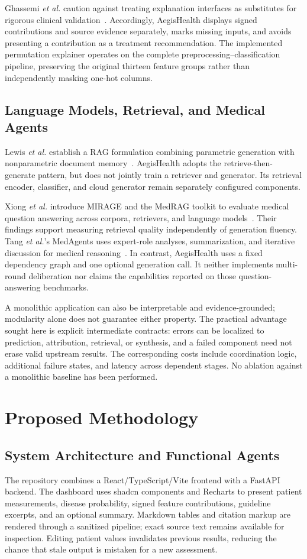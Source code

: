 \documentclass[journal]{IEEEtran}
\newcommand{\system}{AegisHealth}
\begin{document}
Ghassemi \emph{et al.} caution against treating explanation interfaces as substitutes for rigorous clinical validation~\cite{ghassemi2021}. Accordingly, \system{} displays signed contributions and source evidence separately, marks missing inputs, and avoids presenting a contribution as a treatment recommendation. The implemented permutation explainer operates on the complete preprocessing--classification pipeline, preserving the original thirteen feature groups rather than independently masking one-hot columns.

\subsection{Language Models, Retrieval, and Medical Agents}
Lewis \emph{et al.} establish a RAG formulation combining parametric generation with nonparametric document memory~\cite{lewis2020}. \system{} adopts the retrieve-then-generate pattern, but does not jointly train a retriever and generator. Its retrieval encoder, classifier, and cloud generator remain separately configured components.

Xiong \emph{et al.} introduce MIRAGE and the MedRAG toolkit to evaluate medical question answering across corpora, retrievers, and language models~\cite{xiong2024}. Their findings support measuring retrieval quality independently of generation fluency. Tang \emph{et al.}'s MedAgents uses expert-role analyses, summarization, and iterative discussion for medical reasoning~\cite{tang2024}. In contrast, \system{} uses a fixed dependency graph and one optional generation call. It neither implements multi-round deliberation nor claims the capabilities reported on those question-answering benchmarks.

A monolithic application can also be interpretable and evidence-grounded; modularity alone does not guarantee either property. The practical advantage sought here is explicit intermediate contracts: errors can be localized to prediction, attribution, retrieval, or synthesis, and a failed component need not erase valid upstream results. The corresponding costs include coordination logic, additional failure states, and latency across dependent stages. No ablation against a monolithic baseline has been performed.

\section{Proposed Methodology}
\subsection{System Architecture and Functional Agents}
The repository combines a React/TypeScript/Vite frontend with a FastAPI backend. The dashboard uses shadcn components and Recharts to present patient measurements, disease probability, signed feature contributions, guideline excerpts, and an optional summary. Markdown tables and citation markup are rendered through a sanitized pipeline; exact source text remains available for inspection. Editing patient values invalidates previous results, reducing the chance that stale output is mistaken for a new assessment.
\end{document}

